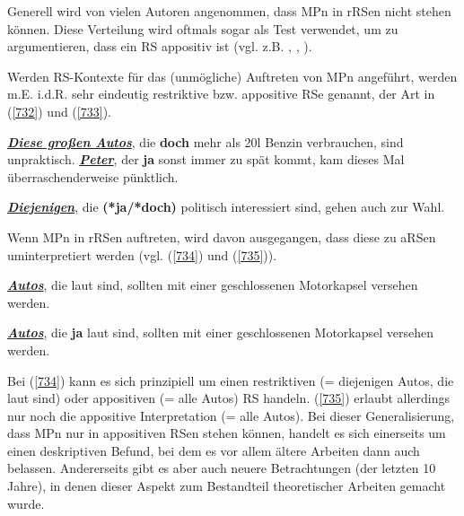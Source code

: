 Generell wird von vielen Autoren angenommen, dass MPn in rRSen nicht stehen können. Diese Verteilung wird oftmals sogar als Test verwendet, um zu argumentieren, dass ein RS appositiv ist (vgl. z.B. \citealt[3]{Becker1978}, \citealt[2007]{Zifonun1997}, \citealt[30]{Holler2005}). 

Werden RS-Kontexte für das (unmögliche) Auftreten von MPn angeführt, werden m.E. i.d.R. sehr eindeutig restriktive bzw. appositive RSe genannt, der Art in (\ref{732}) und (\ref{733}).

\begin{exe}
	\ex\label{732} 
		\begin{xlist}	
			\ex\label{732a} \underline{\textit{\textbf{Diese großen Autos}}}, die \textbf{doch} mehr als 20l Benzin 						verbrauchen, sind unpraktisch.
			\hfill\hbox {\citet[166]{Helbig1994}}
			\ex\label{732b} \underline{\textbf{\textit{Peter}}}, der \textbf{ja} sonst immer zu spät kommt, kam dieses Mal 					überraschenderweise pünktlich.		  
			\hfill\hbox {\citet[135]{Dahl1988}}
		\end{xlist}
\end{exe}
\vspace{-0.65cm}
\begin{exe}
	\ex\label{733} 
	\underline{\textit{\textbf{Diejenigen}}}, die \textbf{(*ja/*doch)} politisch interessiert sind, gehen auch zur Wahl.
	\newline
	\hbox{}\hfill\hbox{\citet[30]{Holler2005}}	
\end{exe}
Wenn MPn in \glq rRSen\grq {} auftreten, wird davon ausgegangen, dass diese zu aRSen uminterpretiert werden (vgl. (\ref{734}) und (\ref{735})).

\begin{exe}
	\ex\label{734} 
	\underline{\textit{\textbf{Autos}}}, die laut sind, sollten mit einer geschlossenen Motorkapsel versehen werden.
\end{exe}
\vspace{-0.65cm}
\begin{exe}
	\ex\label{735} 
	\underline{\textit{\textbf{Autos}}}, die \textbf{ja} laut sind, sollten mit einer geschlossenen Motorkapsel versehen werden.
	\hfill\hbox {\citet[151]{Hartmann1986}}
\end{exe}
Bei (\ref{734}) kann es sich prinzipiell um einen restriktiven (= diejenigen Autos, die laut sind) oder appositiven (= alle Autos) RS handeln. (\ref{735}) erlaubt allerdings nur noch die appositive Interpretation (= alle Autos). Bei dieser Generalisierung, dass MPn nur in appositiven RSen stehen können, handelt es sich einerseits um einen deskriptiven Befund, bei dem es vor allem ältere Arbeiten dann auch belassen. Andererseits gibt es aber auch neuere Betrachtungen (der letzten 10 Jahre), in denen dieser Aspekt zum Bestandteil theoretischer Arbeiten gemacht wurde.

